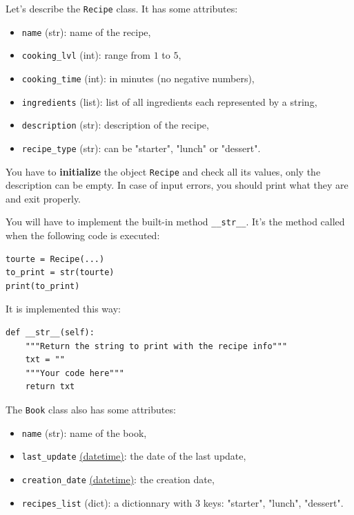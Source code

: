 \documentclass{42-en}
\begin{document}
Let's describe the \texttt{Recipe} class. It has some attributes:
\begin{itemize}
  \item \texttt{name} (str): name of the recipe,
  \item \texttt{cooking\_lvl} (int): range from $1$ to $5$,
  \item \texttt{cooking\_time} (int): in minutes (no negative numbers),
  \item \texttt{ingredients} (list): list of all ingredients each represented by a string,
  \item \texttt{description} (str): description of the recipe,
  \item \texttt{recipe\_type} (str): can be "starter", "lunch" or "dessert".
\end{itemize}

You have to \textbf{initialize} the object \texttt{Recipe} and check all its values, only the description can be empty.
In case of input errors, you should print what they are and exit properly.

You will have to implement the built-in method \texttt{\_\_str\_\_}.
It's the method called when the following code is executed:

\begin{verbatim}
tourte = Recipe(...)
to_print = str(tourte)
print(to_print)
\end{verbatim}

It is implemented this way:

\begin{verbatim}
def __str__(self):
    """Return the string to print with the recipe info"""
    txt = ""
    """Your code here"""
    return txt
\end{verbatim}

The \texttt{Book} class also has some attributes:
\begin{itemize}
  \item \texttt{name} (str): name of the book,
  \item \texttt{last\_update} \href{https://docs.python.org/3/library/datetime.html}{(datetime)}: the date of the last update,
  \item \texttt{creation\_date} \href{https://docs.python.org/3/library/datetime.html}{(datetime)}: the creation date,
  \item \texttt{recipes\_list} (dict): a dictionnary with 3 keys: "starter", "lunch", "dessert".
\end{itemize}
\end{document}
